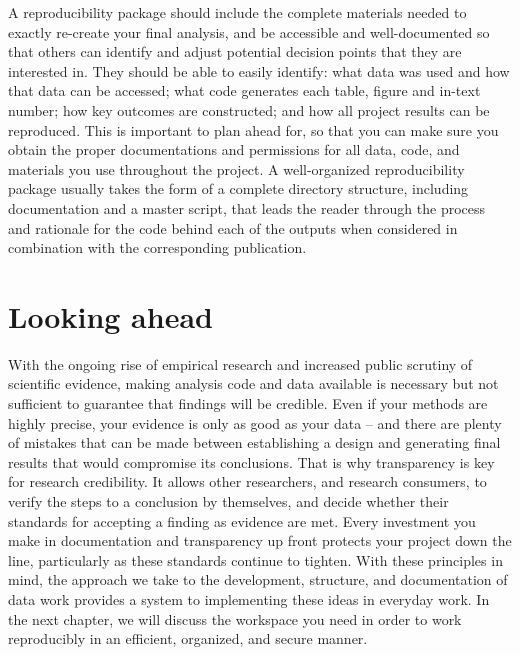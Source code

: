 A reproducibility package should include the complete materials needed
to exactly re-create your final analysis,
and be accessible and well-documented so that others can identify
and adjust potential decision points that they are interested in.
They should be able to easily identify:
what data was used and how that data can be accessed;
what code generates each table, figure and in-text number;
how key outcomes are constructed;
and how all project results can be reproduced.
This is important to plan ahead for,
so that you can make sure you obtain the proper
documentations and permissions
for all data, code, and materials you use throughout the project.
A well-organized reproducibility package usually takes the form
of a complete directory structure, including documentation and a master script,
that leads the reader through the process and rationale
for the code behind each of the outputs
when considered in combination with the corresponding publication.

\section{Looking ahead}
With the ongoing rise of empirical research and increased public scrutiny of scientific evidence,
making analysis code and data available
is necessary but not sufficient to guarantee that findings will be credible.
Even if your methods are highly precise,
your evidence is only as good as your data --
and there are plenty of mistakes that can be made between
establishing a design and generating final results that would compromise its conclusions.
That is why transparency is key for research credibility.
It allows other researchers, and research consumers,
to verify the steps to a conclusion by themselves,
and decide whether their standards for accepting a finding as evidence are met.
Every investment you make in documentation and transparency up front
protects your project down the line, particularly as these standards continue to tighten.
With these principles in mind,
the approach we take to the development, structure,
and documentation of data work
provides a system to implementing these ideas in everyday work.
In the next chapter, we will discuss the workspace you need
in order to work reproducibly in an efficient, organized, and secure manner.

